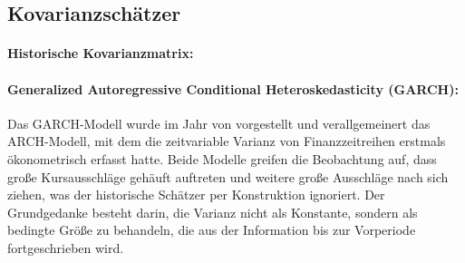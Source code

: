 \documentclass[12pt,a4paper]{article}
\begin{document}
\subsection{Kovarianzschätzer}\label{subsec:kovarianz}

\paragraph{Historische Kovarianzmatrix:}

\paragraph{Generalized Autoregressive Conditional Heteroskedasticity (GARCH):}
\iffalse
Das GARCH-Modell wurde im Jahr \citeyear{bollerslev1986} von \citeauthor{bollerslev1986} vorgestellt und verallgemeinert das ARCH-Modell, mit dem \textcite{engle1982} die zeitvariable Varianz von Finanzzeitreihen erstmals ökonometrisch erfasst hatte.
Beide Modelle greifen die Beobachtung auf, dass große Kursausschläge gehäuft auftreten und weitere große Ausschläge nach sich ziehen, was der historische Schätzer per Konstruktion ignoriert.
Der Grundgedanke besteht darin, die Varianz nicht als Konstante, sondern als bedingte Größe zu behandeln, die aus der Information bis zur Vorperiode fortgeschrieben wird.
\end{document}
